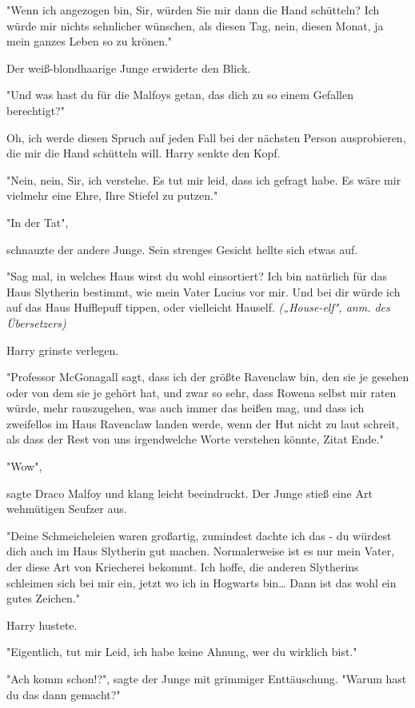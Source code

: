 {"Wenn ich angezogen bin, Sir, würden Sie mir dann die Hand schütteln? Ich würde mir nichts sehnlicher wünschen, als diesen Tag, nein, diesen Monat, ja mein ganzes Leben so zu krönen."

Der weiß-blondhaarige Junge erwiderte den Blick.

"Und was hast du für die Malfoys getan, das dich zu so einem Gefallen berechtigt?"

Oh, ich werde diesen Spruch auf jeden Fall bei der nächsten Person ausprobieren, die mir die Hand schütteln will. Harry senkte den Kopf.

"Nein, nein, Sir, ich verstehe. Es tut mir leid, dass ich gefragt habe. Es wäre mir vielmehr eine Ehre, Ihre Stiefel zu putzen."

"In der Tat",

schnauzte der andere Junge. Sein strenges Gesicht hellte sich etwas auf.

"Sag mal, in welches Haus wirst du wohl einsortiert? Ich bin natürlich für das Haus Slytherin bestimmt, wie mein Vater Lucius vor mir. Und bei dir würde ich auf das Haus Hufflepuff tippen, oder vielleicht Hauself. \emph{(„House-elf", anm. des Übersetzers)}

Harry grinste verlegen.

"Professor McGonagall sagt, dass ich der größte Ravenclaw bin, den sie je gesehen oder von dem sie je gehört hat, und zwar so sehr, dass Rowena selbst mir raten würde, mehr rauszugehen, was auch immer das heißen mag, und dass ich zweifellos im Haus Ravenclaw landen werde, wenn der Hut nicht zu laut schreit, als dass der Rest von uns irgendwelche Worte verstehen könnte, Zitat Ende."

"Wow",

sagte Draco Malfoy und klang leicht beeindruckt. Der Junge stieß eine Art wehmütigen Seufzer aus.

"Deine Schmeicheleien waren großartig, zumindest dachte ich das - du würdest dich auch im Haus Slytherin gut machen. Normalerweise ist es nur mein Vater, der diese Art von Kriecherei bekommt. Ich hoffe, die anderen Slytherins schleimen sich bei mir ein, jetzt wo ich in Hogwarts bin… Dann ist das wohl ein gutes Zeichen."

Harry hustete.

"Eigentlich, tut mir Leid, ich habe keine Ahnung, wer du wirklich bist."

"Ach komm schon!?", sagte der Junge mit grimmiger Enttäuschung. "Warum hast du das dann gemacht?"

}
